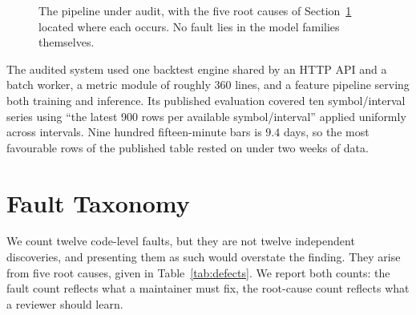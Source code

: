 \documentclass[preprint,12pt,authoryear]{elsarticle}
\begin{document}
\begin{figure}[t]
{}
\caption{The pipeline under audit, with the five root causes of
Section~\ref{sec:defects} located where each occurs. No fault lies in the model
families themselves.}
\label{fig:system}
\end{figure}

The audited system used one backtest engine shared by an HTTP API and a batch
worker, a metric module of roughly 360 lines, and a feature pipeline serving both
training and inference. Its published evaluation covered ten symbol/interval
series using ``the latest 900 rows per available symbol/interval'' applied
uniformly across intervals. Nine hundred fifteen-minute bars is $9.4$ days, so
the most favourable rows of the published table rested on under two weeks of
data.

\section{Fault Taxonomy}
\label{sec:defects}

We count twelve code-level faults, but they are not twelve independent
discoveries, and presenting them as such would overstate the finding. They arise
from five root causes, given in Table~\ref{tab:defects}. We report both counts:
the fault count reflects what a maintainer must fix, the root-cause count
reflects what a reviewer should learn.
\end{document}
